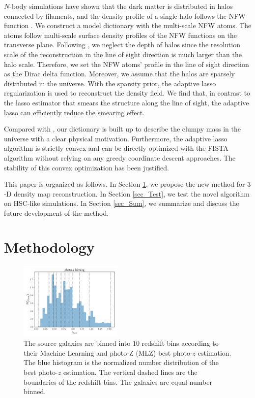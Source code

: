 \documentclass[twocolumn]{aastex62}
\begin{document}
$N$-body simulations have shown that the dark matter is distributed in halos
connected by filaments, and the density profile of a single halo follows the
NFW function \citep{halo-NFW1997ApJ}.  We construct a model dictionary with the
multi-scale NFW atoms.  The atoms follow multi-scale surface density profiles
of the NFW functions \citep{haloModel-TJ2003-3pt} on the transverse plane.
Following \citet{LSS-massMap-Glimpse3D-Leonard2014}, we neglect the depth of
halos since the resolution scale of the reconstruction in the line of sight
direction is much larger than the halo scale. Therefore, we set the NFW atoms'
profile in the line of sight direction as the Dirac delta function.  Moreover,
we assume that the halos are sparsely distributed in the universe.  With the
sparsity prior, the adaptive lasso regularization \citep{AdaLASSO-Zou2006} is
used to reconstruct the density field.  We find that, in contrast to the lasso
estimator that smears the structure along the line of sight, the adaptive lasso
can efficiently reduce the smearing effect.

Compared with \citet{LSS-massMap-Glimpse3D-Leonard2014}, our dictionary is
built up to describe the clumpy mass in the universe with a clear physical
motivation. Furthermore, the adaptive lasso algorithm is strictly convex and
can be directly optimized with the FISTA algorithm \citep{FISTA-Beck2009}
without relying on any greedy coordinate descent approaches. The stability of
this convex optimization has been justified.

This paper is organized as follows.
In Section \ref{sec_Method}, we propose the new method for $3$-D density map
reconstruction.
In Section \ref{sec_Test}, we test the novel algorithm on HSC-like simulations.
In Section \ref{sec_Sum}, we summarize and discuss the future development of
the method.

\section{Methodology}
\label{sec_Method}

\begin{figure}
 \centering
 \includegraphics[width=0.45\textwidth]{photo-z_binning.pdf}
 \caption{The source galaxies are binned into $10$ redshift bins according to
     their Machine Learning and photo-Z (MLZ) best photo-$z$ estimation. The
     blue histogram is the normalized number distribution of the best photo-$z$
     estimation. The vertical dashed lines are the boundaries of the redshift
     bins.  The galaxies are equal-number binned.
        } \label{fig_bestpz}
\end{figure}
\end{document}
